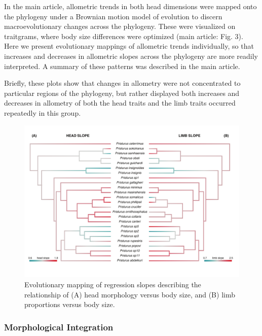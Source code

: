 \documentclass[
  11pt,
]{article}
\begin{document}
In the main article, allometric trends in both head dimensions were
mapped onto the phylogeny under a Brownian motion model of evolution to
discern macroevolutionary changes across the phylogeny. These were
visualized on traitgrams, where body size differences were optimized
(main article: Fig. 3). Here we present evolutionary mappings of
allometric trends individually, so that increases and decreases in
allometric slopes across the phylogeny are more readily interpreted. A
summary of these patterns was described in the main article.

Briefly, these plots show that changes in allometry were not
concentrated to particular regions of the phylogeny, but rather
displayed both increases and decreases in allometry of both the head
traits and the limb traits occurred repeatedly in this group.

\begin{figure}[H]

{\centering \includegraphics[width=1\linewidth]{Figs/contmap_slopes} 

}

\caption{Evolutionary mapping of regression slopes describing the relationship of (A) head morphology versus body size, and (B) limb proportions versus body size.}\label{fig:unnamed-chunk-6}
\end{figure}

\newpage

\hypertarget{morphological-integration}{%
\subsubsection{Morphological
Integration}\label{morphological-integration}}
\end{document}
